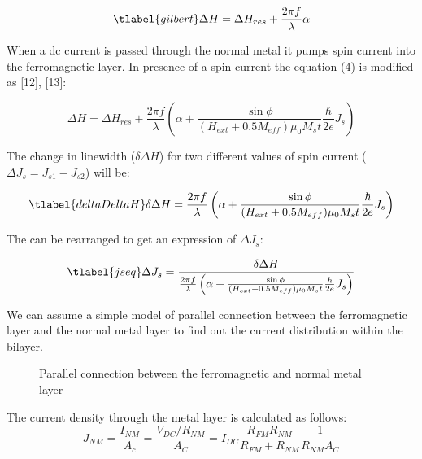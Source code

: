 \begin{equation}
    \tlabel{gilbert}
    \Delta H = \Delta H_{res} + \frac{2\pi f}{\lambda}\alpha
\end{equation}

When a dc current is passed through the normal metal it pumps spin current into the ferromagnetic 
layer. In presence of a spin current the equation (4) is modified as [12], [13]:

\begin{equation}
    \Delta H = \Delta H_{res} + \frac{2\pi f}{\lambda} \left( 
        \alpha + \frac{\sin{\phi}}{(H_{ext} + 0.5M_{eff}) \mu_{0} M_{s} t}  
        \frac{\hbar}{2e}J_{s}
    \right)
\end{equation}

The change in linewidth ($\delta \Delta H$) for two different values of spin current 
($\Delta J_{s} = J_{s1} - J_{s2}$) will be:

\begin{equation}
    \tlabel{deltaDeltaH}
    \delta \Delta H = \frac{2\pi f}{\lambda} \left( 
        \alpha + \frac{\sin{\phi}}{(H_{ext} + 0.5M_{eff}) \mu_{0} M_{s} t} 
        \frac{\hbar}{2e}J_{s}
        \right)
\end{equation}

The  can be rearranged to get an expression of $\Delta J_{s}$:

\begin{equation}
    \tlabel{jseq}
    \Delta J_{s} = \frac{\delta \Delta H}{
        \frac{2\pi f}{\lambda} \left( 
        \alpha + \frac{\sin{\phi}}{(H_{ext} + 0.5M_{eff}) \mu_{0} M_{s} t} 
        \frac{\hbar}{2e}J_{s}
        \right)
    }
\end{equation}

We can assume a simple model of parallel connection between the ferromagnetic layer and 
the normal metal layer to find out the current distribution within the bilayer.

\begin{figure}
   
    \centering
    

    \caption{Parallel connection between the ferromagnetic and normal metal layer}
    
\end{figure}

The current density through the metal layer is calculated as follows:
\begin{equation}
        J_{NM} = \frac{I_{NM}}{A_{c}} = \frac{V_{DC}/R_{NM}}{A_{C}} 
        = I_{DC} \frac{R_{FM} R_{NM}}{R_{FM} + R_{NM}} \frac{1}{R_{NM} A_{C}}
\end{equation}

